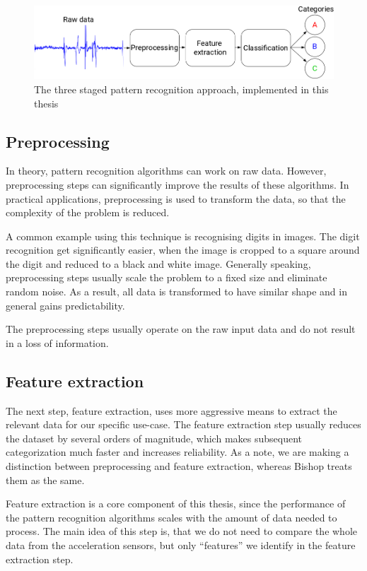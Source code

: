 \begin{figure}
    \centering
    \includegraphics[width=\textwidth]{figures/PatternRecognitionSteps.png}
    \caption{The three staged pattern recognition approach, implemented in this thesis}
    \label{fig:patternrecognitionsteps}
\end{figure}

\subsection{Preprocessing}
In theory, pattern recognition algorithms can work on raw data. However, preprocessing steps can significantly improve the results of these algorithms. In practical applications, preprocessing is used to transform the data, so that the complexity of the problem is reduced. 

A common example using this technique is recognising digits in images. The digit recognition get significantly easier, when the image is cropped to a square around the digit and reduced to a black and white image. Generally speaking, preprocessing steps usually scale the problem to a fixed size and eliminate random noise. As a result, all data is transformed to have similar shape and in general gains predictability.

The preprocessing steps usually operate on the raw input data and do not result in a loss of information.

\subsection{Feature extraction}
The next step, feature extraction, uses more aggressive means to extract the relevant data for our specific use-case. The feature extraction step usually reduces the dataset by several orders of magnitude, which makes subsequent categorization much faster and increases reliability. As a note, we are making a distinction between preprocessing and feature extraction, whereas Bishop \cite{bishop2006pattern} treats them as the same.

Feature extraction is a core component of this thesis, since the performance of the pattern recognition algorithms scales with the amount of data needed to process. The main idea of this step is, that we do not need to compare the whole data from the acceleration sensors, but only ``features'' we identify in the feature extraction step.

